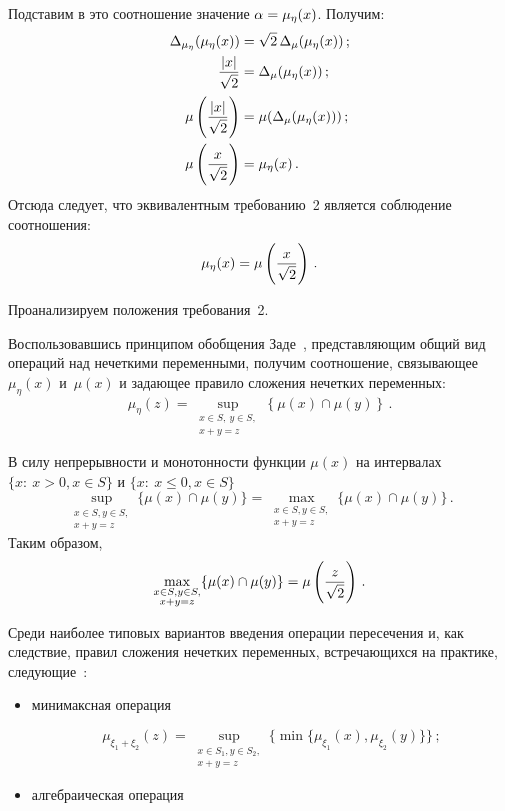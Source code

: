 \begin{multicols}{2}
  Подставим в это соотношение значение $\alpha\hm=\mu_\eta(x)$. Получим:
  \begin{align*}
  \Delta_{\mu_\eta}(\mu_\eta(x)) &=\sqrt{2}\,\Delta_\mu(\mu_\eta(x))\,;\\
  \displaystyle\frac{\displaystyle \vert x\vert\mathstrut}{\displaystyle \sqrt{2}\mathstrut} &=\Delta_\mu (\mu_\eta(x))\,;\\
  \mu\left( \displaystyle\frac{\displaystyle \vert x\vert\mathstrut}{\displaystyle \sqrt{2}\mathstrut}\right) &=\mu(\Delta_\mu(\mu_\eta(x)))\,;\\
  \mu\left(\displaystyle\frac{\displaystyle x\mathstrut}{\displaystyle \sqrt{2}\mathstrut}\right) &=\mu_\eta(x)\,.
  \end{align*}
  Отсюда следует, что эквивалентным требованию~2 является 
соблюдение соотношения:
  $$
  \mu_\eta(x) =\mu\left( \displaystyle\frac{\displaystyle x\mathstrut}{\displaystyle \sqrt{2}\mathstrut}\right)\,.
  $$
  
Проанализируем положения требования~2.
  
  Воспользовавшись принципом обобщения Заде~\cite{11sem}, 
представляющим общий вид операций над нечеткими переменными, получим 
соотношение, связывающее~$\mu_\eta(x)$ и~$\mu(x)$ и задающее правило 
сложения нечетких переменных: 
  $$
  \mu_\eta(z)=\sup\limits_{\substack{{x\in S,\ y\in S,}\\{x+y=z}}}
  \left\{ \mu(x)\cap \mu(y)\right\}\,.
  $$
  
  В силу непрерывности и монотонности функции $\mu(x)$ на интервалах $\{x:\ 
x>0, x\in S\}$ и $\{x:\ x\leq 0, x\in S\}$ 
  $$
  \sup\limits_{\substack{{x\in S, y\in S,}\\{x+y=z}}} \{\mu(x)\cap 
\mu(y)\}=\max\limits_{\substack{{x\in S, y\in S,}\\{x+y=z}}} \{\mu(x)\cap \mu(y)\}\,.
$$ 
Таким образом, 
\begin{equation}
\max\limits_{\substack{{x\in S, y\in  S,}\\{x+y=z}}}\{\mu(x)\cap \mu(y)\}=\mu\left(\displaystyle\frac{\displaystyle z\mathstrut}{\displaystyle \sqrt{2}\mathstrut}\right)\,.
\label{e0-sem}
\end{equation}

Среди наиболее 
типовых вариантов введения операции пересечения и, как следствие, правил 
сложения нечетких переменных, встречающихся на практике, 
сле\-ду\-ющие~\cite{13sem}:
  \begin{itemize}
  \item минимаксная операция 
  
    \noindent
$$
\mu_{\xi_1+\xi_2}(z)=\sup\limits_{\substack{{x\in S_1, y\in S_2,}\\{x+y=z}}} 
\{\min\{\mu_{\xi_1}(x),\mu_{\xi_2}(y)\}\}\,;
$$
  \item алгебраическая операция 
  

\end{itemize}
\end{multicols}
